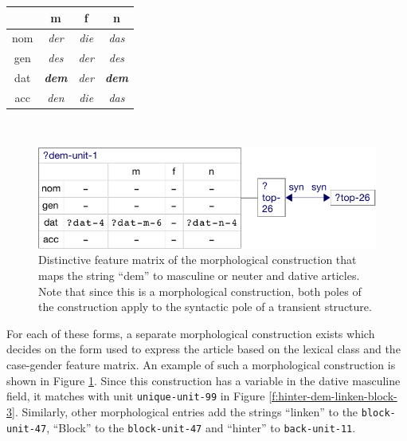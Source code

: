 \begin{center}
  \begin{tabular}{ c || c | c | c }
    & m & f & n \\ \hline\hline
    nom  & \emph{der} & \emph{die} & \emph{das} \\ \hline
    gen  & \emph{des} & \emph{der} & \emph{des} \\ \hline
    dat & \bf{\emph{dem}} & \emph{der} & \bf{\emph{dem}} \\ \hline
    acc & \emph{den} & \emph{die} & \emph{das} \\ 
  
  \end{tabular}
\end{center}
~\\

\begin{figure}[t]
  \centerline{\includegraphics[scale=0.65]{figs/dem-morph-fvm}}
  \caption[Distinctive feature matrix of a morphological construction]{
  Distinctive feature matrix of the morphological construction
    that maps the string ``dem'' to masculine or neuter and dative
    articles. Note that since this is a morphological construction, both
    poles of the construction apply to the syntactic pole of a transient
    structure.}
  \label{f:dem-morph}
\end{figure}

For each of these forms, a separate morphological construction exists
which decides on the form used to express the article
based on the lexical class and the case-gender feature matrix. An example of such a
morphological construction is shown in Figure \ref{f:dem-morph}. Since
this construction has a variable in the dative masculine field, it
matches with unit {\footnotesize\texttt{unique-unit-99}} in Figure
\ref{f:hinter-dem-linken-block-3}. Similarly, other morphological
entries add the strings ``linken'' to the {\footnotesize\texttt{block-unit-47}},
``Block'' to the {\footnotesize\texttt{block-unit-47}} and ``hinter'' to
{\footnotesize\texttt{back-unit-11}}.

